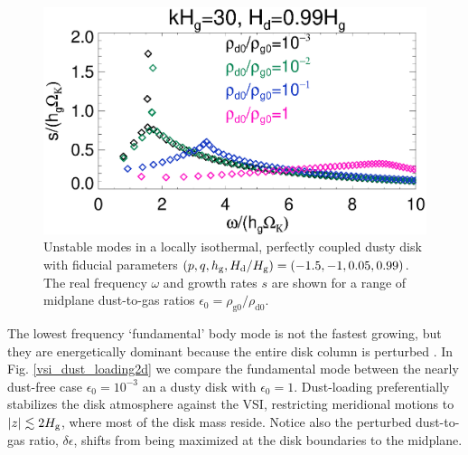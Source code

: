 \begin{figure}
  \includegraphics[width=\linewidth]{figures/compare_eigenvals_kx30Hd1} 
  \caption{Unstable modes in a locally isothermal, perfectly coupled
    dusty disk with fiducial parameters
    $(p,q,h_\mathrm{g}, H_\mathrm{d}/H_\mathrm{g} )=(-1.5,-1,0.05, 0.99)$. The real
    frequency $\omega$ and growth rates $s$ are shown for a range of
    midplane dust-to-gas ratios $\epsilon_0=\rho_\mathrm{g0}/\rho_\mathrm{d0}$. 
    \label{vsi_dust_loading}
    }
\end{figure}

The lowest frequency `fundamental' body mode is not the fastest
growing, but they are energetically dominant because the entire disk
column is perturbed \citep[cf. surface modes which only disturb the
  disk boundaries,][]{umurhan16c}. In Fig. \ref{vsi_dust_loading2d}
we compare the fundamental mode between the nearly 
dust-free case $\epsilon_0=10^{-3}$ an a dusty disk with
$\epsilon_0=1$. Dust-loading preferentially
stabilizes the disk atmosphere against the VSI, restricting
meridional motions to $|z|\lesssim 2H_\mathrm{g}$, where most of the disk mass
reside. Notice also the perturbed dust-to-gas ratio,
$\delta\epsilon$, shifts from being maximized at the disk boundaries
to the midplane. 

